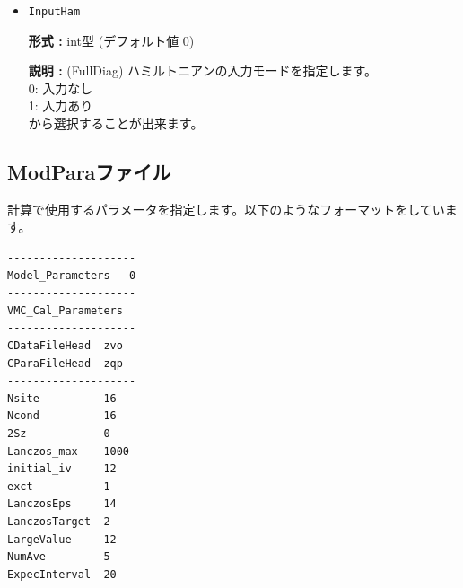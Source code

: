 \begin{itemize}
{\bf 説明 :} {
{
(FullDiag) ハミルトニアンの出力モードを指定します。\\
0: 出力なし\\
1: 出力あり\\
から選択することが出来ます。}
}

\item  \verb|InputHam|

{\bf 形式 :} {int型 (デフォルト値 0)}

{\bf 説明 :} {
{
(FullDiag) ハミルトニアンの入力モードを指定します。\\
0: 入力なし\\
1: 入力あり\\
から選択することが出来ます。}
}



\end{itemize}

\newpage
\subsection{{ModParaファイル}}
\label{Subsec:modpara}
計算で使用するパラメータを指定します。以下のようなフォーマットをしています。\\
\begin{minipage}{10cm}
\begin{screen}
\begin{verbatim}
--------------------
Model_Parameters   0
--------------------
VMC_Cal_Parameters
--------------------
CDataFileHead  zvo
CParaFileHead  zqp
--------------------
Nsite          16   
Ncond          16    
2Sz            0    
Lanczos_max    1000 
initial_iv     12   
exct           1    
LanczosEps     14   
LanczosTarget  2    
LargeValue     12   
NumAve         5    
ExpecInterval  20   
\end{verbatim}
\end{screen}
\end{minipage}

